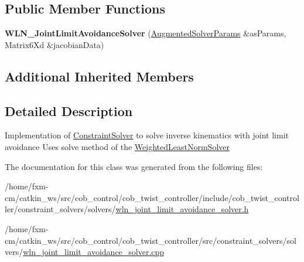 \subsection*{Public Member Functions}
\begin{DoxyCompactItemize}
\item 
\hypertarget{classWLN__JointLimitAvoidanceSolver_a943e85fe29f9ef0e1d1c30dc69add744}{{\bfseries W\-L\-N\-\_\-\-Joint\-Limit\-Avoidance\-Solver} (\hyperlink{structAugmentedSolverParams}{Augmented\-Solver\-Params} \&as\-Params, Matrix6\-Xd \&jacobian\-Data)}\label{classWLN__JointLimitAvoidanceSolver_a943e85fe29f9ef0e1d1c30dc69add744}

\end{DoxyCompactItemize}
\subsection*{Additional Inherited Members}


\subsection{Detailed Description}
Implementation of \hyperlink{classConstraintSolver}{Constraint\-Solver} to solve inverse kinematics with joint limit avoidance Uses solve method of the \hyperlink{classWeightedLeastNormSolver}{Weighted\-Least\-Norm\-Solver} 

The documentation for this class was generated from the following files\-:\begin{DoxyCompactItemize}
\item 
/home/fxm-\/cm/catkin\-\_\-ws/src/cob\-\_\-control/cob\-\_\-twist\-\_\-controller/include/cob\-\_\-twist\-\_\-controller/constraint\-\_\-solvers/solvers/\hyperlink{wln__joint__limit__avoidance__solver_8h}{wln\-\_\-joint\-\_\-limit\-\_\-avoidance\-\_\-solver.\-h}\item 
/home/fxm-\/cm/catkin\-\_\-ws/src/cob\-\_\-control/cob\-\_\-twist\-\_\-controller/src/constraint\-\_\-solvers/solvers/\hyperlink{wln__joint__limit__avoidance__solver_8cpp}{wln\-\_\-joint\-\_\-limit\-\_\-avoidance\-\_\-solver.\-cpp}\end{DoxyCompactItemize}
